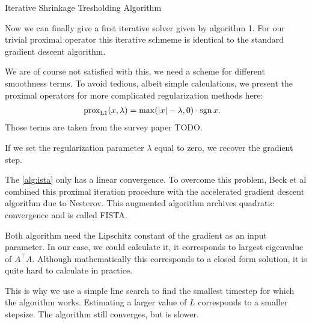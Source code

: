 \begin{algorithm}
 \caption{Iterative Shrinkage Tresholding Algorithm} \label{alg:ista} 
 \begin{algorithmic}[1]
    \Statex
     
      \EndWhile
     \State {}
    \EndFunction
\end{algorithmic}
\end{algorithm}

Now we can finally give a first iterative solver given by algorithm 1.
For our trivial proximal operator this iterative schmeme is identical to the
standard gradient descent algorithm.

We are of course not satisfied with this, we need a scheme for different
smoothness terms. 
To avoid tedious, albeit simple calculations, we present the proximal operators
for more complicated regularization methods here:
\begin{align}
 \prox[L1]{x}{\lambda} &= \max (\vert x \vert - \lambda,0) \cdot \sign x.
\end{align}
Those terms are taken from the survey paper TODO.

If we set the regularization parameter \(\lambda\) equal to zero, we recover
the gradient step.

The \autoref{alg:ista} only has a linear convergence. 
To overcome this problem, Beck et al combined this proximal iteration procedure
with the accelerated gradient descent algorithm due to Nesterov. 
This augmented algorithm archives quadratic convergence and is called FISTA.

Both algorithm need the Lipschitz constant of the gradient as an input
parameter.
In our case, we could calculate it, it corresponds to largest eigenvalue of 
\(A^\intercal A\).
Although mathematically this corresponds to a closed form solution, it is quite
hard to calculate in practice.

This is why we use a simple line search to find the smallest timestep for which
the algorithm works. 
Estimating a larger value of \(L\) corresponds to a smaller stepsize.
The algorithm still converges, but is slower.


